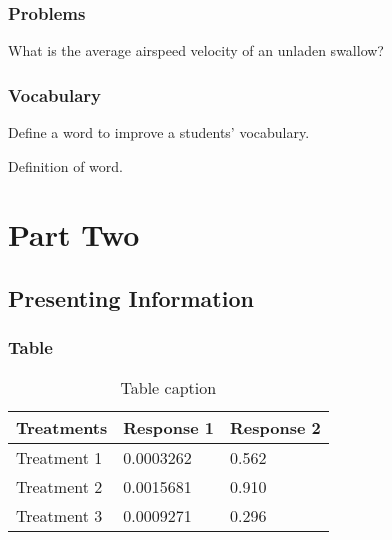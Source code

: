 \documentclass[11pt,fleqn,a5paper]{book} %
\begin{document}
    \section{Problems}
    
    \begin{problem}
    What is the average airspeed velocity of an unladen swallow?
    \end{problem}
    
    
    \section{Vocabulary}
    
    Define a word to improve a students' vocabulary.
    
    \begin{vocabulary}[Word]
    Definition of word.
    \end{vocabulary}
    
    
    \part{Part Two}
    
    
    
    \chapter{Presenting Information}
    
    \section{Table}
    
    \begin{table}[h]
    \centering
    \begin{tabular}{l l l}
    \toprule
    \textbf{Treatments} & \textbf{Response 1} & \textbf{Response 2}\\
    \midrule
    Treatment 1 & 0.0003262 & 0.562 \\
    Treatment 2 & 0.0015681 & 0.910 \\
    Treatment 3 & 0.0009271 & 0.296 \\
    \bottomrule
    \end{tabular}
    \caption{Table caption}
    \end{table}
    
\end{document}
